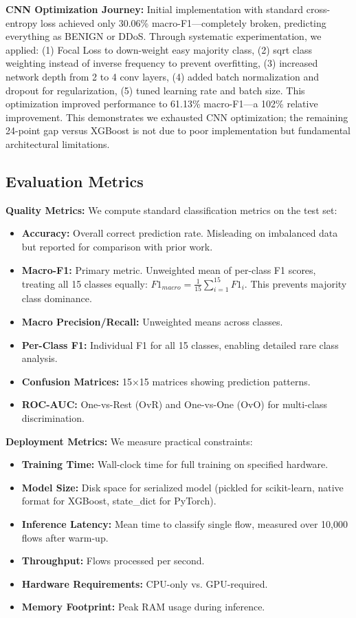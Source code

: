 \documentclass[10pt,twocolumn]{article}
\begin{document}
\textbf{CNN Optimization Journey:} Initial implementation with standard cross-entropy loss achieved only 30.06\% macro-F1---completely broken, predicting everything as BENIGN or DDoS. Through systematic experimentation, we applied: (1) Focal Loss to down-weight easy majority class, (2) sqrt class weighting instead of inverse frequency to prevent overfitting, (3) increased network depth from 2 to 4 conv layers, (4) added batch normalization and dropout for regularization, (5) tuned learning rate and batch size. This optimization improved performance to 61.13\% macro-F1---a 102\% relative improvement. This demonstrates we exhausted CNN optimization; the remaining 24-point gap versus XGBoost is not due to poor implementation but fundamental architectural limitations.

\subsection{Evaluation Metrics}

\textbf{Quality Metrics:} We compute standard classification metrics on the test set:
\begin{itemize}
    \item \textbf{Accuracy:} Overall correct prediction rate. Misleading on imbalanced data but reported for comparison with prior work.
    \item \textbf{Macro-F1:} Primary metric. Unweighted mean of per-class F1 scores, treating all 15 classes equally: $F1_{macro} = \frac{1}{15}\sum_{i=1}^{15} F1_i$. This prevents majority class dominance.
    \item \textbf{Macro Precision/Recall:} Unweighted means across classes.
    \item \textbf{Per-Class F1:} Individual F1 for all 15 classes, enabling detailed rare class analysis.
    \item \textbf{Confusion Matrices:} 15×15 matrices showing prediction patterns.
    \item \textbf{ROC-AUC:} One-vs-Rest (OvR) and One-vs-One (OvO) for multi-class discrimination.
\end{itemize}


\textbf{Deployment Metrics:} We measure practical constraints:
\begin{itemize}
    \item \textbf{Training Time:} Wall-clock time for full training on specified hardware.
    \item \textbf{Model Size:} Disk space for serialized model (pickled for scikit-learn, native format for XGBoost, state\_dict for PyTorch).
    \item \textbf{Inference Latency:} Mean time to classify single flow, measured over 10,000 flows after warm-up.
    \item \textbf{Throughput:} Flows processed per second.
    \item \textbf{Hardware Requirements:} CPU-only vs. GPU-required.
    \item \textbf{Memory Footprint:} Peak RAM usage during inference.
\end{itemize}
\end{document}
